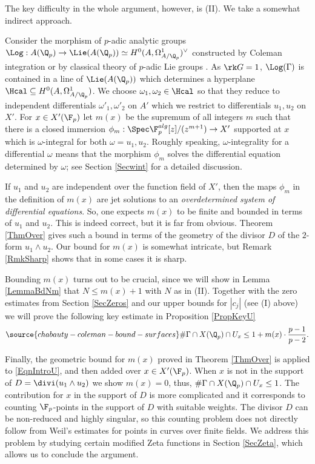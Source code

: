 The key difficulty in the whole argument, however, is (II). We take a somewhat indirect approach.

Consider the morphism of $p$-adic analytic groups $\Log:A(\Q_p)\to \Lie(A(\Q_p))\simeq H^0(A,\Omega^1_{A/\Q_p})^\vee$ constructed by Coleman integration or by classical theory of $p$-adic Lie groups \cite{Bourbaki}. As $\rk G=1$,  $\Log(\Gamma)$ is contained in a line of $\Lie(A(\Q_p))$ which determines a hyperplane $\Hcal\subseteq H^0(A,\Omega^1_{A/\Q_p})$. We choose $\omega_1,\omega_2\in \Hcal$ so that they reduce to independent differentials $\omega'_1,\omega'_2$ on $A'$ which we restrict to differentials $u_1,u_2$ on $X'$. For $x\in X'(\F_p)$ let $m(x)$ be the supremum of all integers $m$ such that there is a closed immersion $\phi_m:\Spec \F_p^{alg}[z]/(z^{m+1})\to X'$ supported at $x$ which is $\omega$-integral for both $\omega=u_1,u_2$. Roughly speaking, $\omega$-integrality for a differential $\omega$ means that the morphism $\phi_m$ solves the differential equation determined by $\omega$; see Section \ref{Secwint} for a detailed discussion.

If $u_1$ and $u_2$ are independent over the function field of  $X'$, then the maps $\phi_m$ in the definition of $m(x)$ are jet solutions to an \emph{overdetermined system of differential equations}. So, one expects $m(x)$ to be finite and bounded in terms of $u_1$ and $u_2$. This is indeed correct, but it is far from obvious. Theorem \ref{ThmOver} gives such a bound in terms of the geometry of the divisor $D$ of the $2$-form $u_1\wedge u_2$. Our bound for $m(x)$ is somewhat intricate, but Remark \ref{RmkSharp} shows that in some cases it is sharp.


Bounding $m(x)$ turns out to be crucial, since we will show in Lemma \ref{LemmaBdNm} that $N\le m(x)+1$ with $N$ as in (II). Together with the zero estimates from Section \ref{SecZeros} and our upper bounds for $|c_j|$ (see (I) above) we will prove the following key estimate in Proposition \ref{PropKeyU}
\begin{equation}\label{EqnIntroU}
\source{chabauty-coleman-bound-surfaces}
\#\Gamma\cap X(\Q_p)\cap U_x\le 1+ m(x)\cdot\frac{p-1}{p-2}.
\end{equation}

Finally, the geometric bound for $m(x)$ proved in Theorem \ref{ThmOver} is applied to \eqref{EqnIntroU}, and then added over $x\in X'(\F_p)$. When $x$ is not in the support of $D=\divi(u_1\wedge u_2)$ we show $m(x)=0$, thus, $\#\Gamma\cap X(\Q_p)\cap U_x\le 1$.  The contribution for $x$ in the support of $D$ is more complicated and it corresponds to counting $\F_p$-points in the support of  $D$ with suitable weights. The divisor $D$ can be non-reduced and highly singular, so this counting problem does not directly follow from Weil's estimates for points in curves over finite fields. We address this problem by studying certain modified Zeta functions in Section \ref{SecZeta}, which allows us to conclude the argument.




